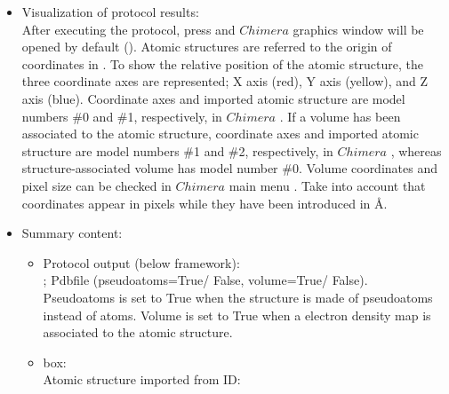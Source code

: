 \begin{itemize}
  \item Visualization of protocol results:\\
  
  After executing the protocol, press  and $Chimera$ graphics window will be opened by default (). 
  Atomic structures are referred to the origin of coordinates in \chimera. To show the relative position of the atomic structure, the three coordinate axes are represented; X axis (red), Y axis (yellow), and Z axis (blue). Coordinate axes and imported atomic structure are model numbers \#0 and \#1, respectively, in $Chimera$ . If a volume has been associated to the atomic structure, coordinate axes and imported atomic structure are model numbers \#1 and \#2, respectively, in $Chimera$ , whereas structure-associated volume has model number \#0. Volume coordinates and pixel size can be checked in $Chimera$ main menu . Take into account that coordinates appear in pixels while they have been introduced in \AA.\\
   
   \item Summary content:\\
    \begin{itemize}
     \item Protocol output (below \scipion framework):\\ ; Pdbfile (pseudoatoms=True/ False, volume=True/ False).\\Pseudoatoms is set to True when the structure is made of pseudoatoms instead of atoms. Volume is set to True when a electron density map is associated to the atomic structure.\\
     \item {} box:\\Atomic structure imported from ID: \\
    \end{itemize}

  \end{itemize}
